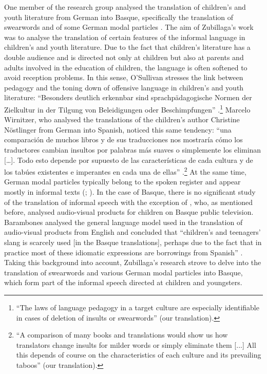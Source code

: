 \documentclass[output=paper]{LSP/langsci}
\begin{document}
One member of the research group analysed the translation of children’s and youth literature from German into Basque, specifically the translation of swearwords and of some German modal particles \citep{Zubillaga2013}. The aim of Zubillaga’s work was to analyse the translation of certain features of the informal language in children’s and youth literature. Due to the fact that children’s literature has a double audience and is directed not only at children but also at parents and adults involved in the education of children, the language is often softened to avoid reception problems. In this sense, O’Sullivan stresses the link between pedagogy and the toning down of offensive language in children’s and youth literature: “Besonders deutlich erkennbar sind sprachpädagogische Normen der Zielkultur in der Tilgung von Beleidigungen oder Beschimpfungen” \citep[212]{OSullivan2000}.\footnote{“The laws of language pedagogy in a target culture are especially identifiable in cases of deletion of insults or swearwords” (our translation).} Marcelo Wirnitzer, who analysed the translations of the children’s author Christine Nöstlinger from German into Spanish, noticed this same tendency: “una comparación de muchos libros y de sus traducciones nos mostraría cómo los traductores cambian insultos por palabras más suaves o simplemente los eliminan […]. Todo esto depende por supuesto de las características de cada cultura y de los tabúes existentes e imperantes en cada una de ellas” \citep[146]{Marcelo2007}.\footnote{“A comparison of many books and translations would show us how translators change insults for milder words or simply eliminate them [...] All this depends of course on the characteristics of each culture and its prevailing taboos” (our translation).} At the same time, German modal particles typically belong to the spoken register and appear mostly in informal texts (\citealt[12]{Helbig1988}; \citealt[16]{Pruefer1995}). In the case of Basque, there is no significant study of the translation of informal speech with the exception of \citet{Barambones2012}, who, as mentioned before, analysed audio-visual products for children on Basque public television. Barambones analysed the general language model used in the translation of audio-visual products from English and concluded that “children’s and teenagers’ slang is scarcely used [in the Basque translations], perhaps due to the fact that in practice most of these idiomatic expressions are borrowings from Spanish” \citep[166--167]{Barambones2012}. Taking this background into account, Zubillaga's research strove to delve into the translation of swearwords and various German modal particles into Basque, which form part of the informal speech directed at children and youngsters.
\end{document}
